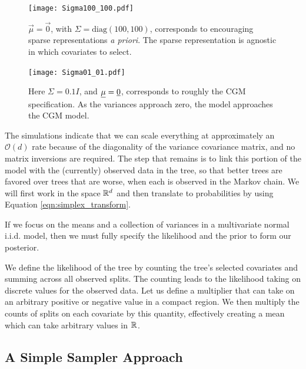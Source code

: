  \begin{figure}[ht]
\begin{minipage}[b]{0.45\linewidth}
\centering
\texttt{[image: Sigma100\_100.pdf]}
\caption[ALN plot with a zero vector mean and $\Sigma=\text{Diag}(100,100)$]{$\vec{\mu}=\vec{0}$, with
 $\Sigma= \text{diag}(100, 100)$, corresponds to encouraging sparse representations \emph{a priori}. The sparse representation is agnostic in which covariates to select.  }
\label{fig:figure7}
\end{minipage}
\hspace{0.5cm}
\begin{minipage}[b]{0.45\linewidth}
\centering
\texttt{[image: Sigma01\_01.pdf]}
\caption[ALN plot approximating the CGM model]{Here $\Sigma=0.1I$, and $\underline{\mu}=\underline{{0}}$, corresponds to roughly the CGM specification. As the variances approach zero, the model approaches the CGM model.}
\label{fig:figure8}
\end{minipage}
\end{figure}

 The simulations indicate that we can scale everything at approximately an $\mathcal{O}(d)$ rate because of the diagonality of the variance covariance matrix, and no matrix inversions are required. The step that remains is to link this portion of the model with the (currently) observed data in the tree, so that better trees are favored over trees that are worse, when each is observed in the Markov chain. We will first work in the space $\mathbb{R}^{d}$ and then translate to probabilities by using Equation \ref{eqn:simplex_transform}.  
 
 If we focus on the means and a collection of variances in a multivariate normal i.i.d. model, then we must fully specify the likelihood and the prior to form our posterior. 
 
We define the likelihood of the tree by counting the tree's selected covariates and summing across all observed splits. The counting leads to the likelihood taking on discrete values for the observed data. Let us define a multiplier that can take on an arbitrary positive or negative value in a compact region. We then multiply the counts of splits on each covariate by this quantity, effectively creating a mean which can take arbitrary values in $\mathbb{R}^{}$. 

\subsection{A Simple Sampler Approach}\label{subsec:simple_sampler}


